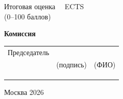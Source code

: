 \begin{titlepage}
\vspace{0.3cm}
\noindent Итоговая оценка \hrulefill\ \ ECTS \hrulefill\\
\hspace*{2.3cm}(0--100 баллов)

\vspace{0.4cm}
\noindent\textbf{Комиссия}

\vspace{0.25cm}
\noindent
\begin{tabular}{@{}p{3.2cm}p{4.5cm}p{4.5cm}@{}}
Председатель & \hrulefill & \hrulefill \\
 & {\footnotesize (подпись)} & {\footnotesize (ФИО)} \\[5pt]
 & \hrulefill & \hrulefill \\[5pt]
 & \hrulefill & \hrulefill \\[5pt]
 & \hrulefill & \hrulefill \\
\end{tabular}

\vfill
\begin{center}
Москва 2026
\end{center}
\end{titlepage}
